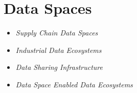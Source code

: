 
\section{Data Spaces}

\begin{itemize}
    \item \emph{Supply Chain Data Spaces}
    \item \emph{Industrial Data Ecosystems}
    \item \emph{Data Sharing Infrastructure}
    \item \emph{Data Space Enabled Data Ecosystems}
\end{itemize}

